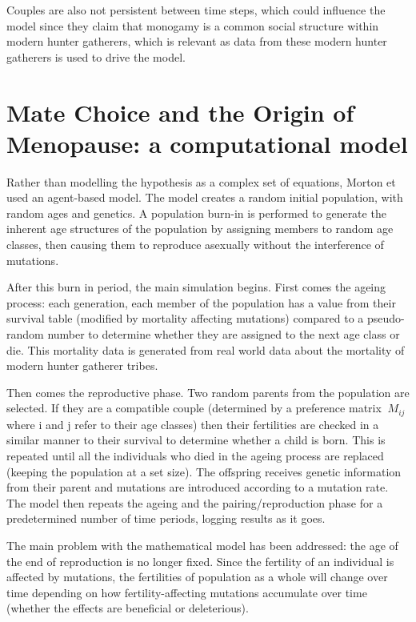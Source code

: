 \documentclass[authoryearcitations]{UoYCSproject}
\begin{document}
Couples are also not persistent between time steps, which could influence the model since they claim that monogamy is a common social structure within modern hunter gatherers, which is relevant as data from these modern hunter gatherers is used to drive the model. 

\section{Mate Choice and the Origin of Menopause: a computational model}
Rather than modelling the hypothesis as a complex set of equations, Morton et \cite{mateChoice2013} used an agent-based model. The model creates a random initial population, with random ages and genetics. A population burn-in is performed to generate the inherent age structures of the population by assigning members to random age classes, then causing them to reproduce asexually without the interference of mutations.

After this burn in period, the main simulation begins. First comes the ageing process: each generation, each member of the population has a value from their survival table (modified by mortality affecting mutations) compared to a pseudo-random number to determine whether they are assigned to the next age class or die. This mortality data is generated from real world data about the mortality of modern hunter gatherer tribes.

Then comes the reproductive phase. Two random parents from the population are selected. If they are a compatible couple (determined by a preference matrix $\ M_{ij} $ where i and j refer to their age classes) then their fertilities are checked in a similar manner to their survival to determine whether a child is born. This is repeated until all the individuals who died in the ageing process are replaced (keeping the population at a set size). The offspring receives genetic information from their parent and mutations are introduced according to a mutation rate. The model then repeats the ageing and the pairing/reproduction phase for a predetermined number of time periods, logging results as it goes.

The main problem with the mathematical model has been addressed: the age of the end of reproduction is no longer fixed. Since the fertility of an individual is affected by mutations, the fertilities of population as a whole will change over time depending on how fertility-affecting mutations accumulate over time (whether the effects are beneficial or deleterious).
\end{document}
